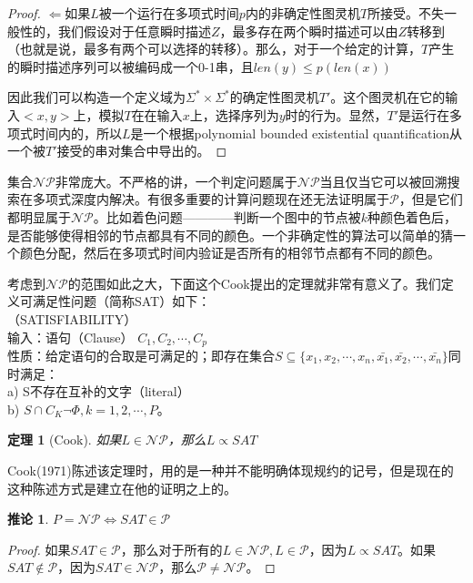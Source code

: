 \documentclass[twocolumn]{article}
\newtheorem{theorem}{\hspace{2em}定理}
\newtheorem{corollary}{\hspace{2em}推论}
\theoremstyle{nonumberplain}%
\newtheorem{proof}{\hspace{2em}证明}
\begin{document}
\begin{CJK}{UTF8}{gbsn}
\begin{proof}
        $\Leftarrow$如果$L$被一个运行在多项式时间$p$内的非确定性图灵机$T$所接受。不失一般性的，我们假设对于任意瞬时描述$Z$，最多存在两个瞬时描述可以由$Z$转移到（也就是说，最多有两个可以选择的转移）。那么，对于一个给定的计算，$T$产生的瞬时描述序列可以被编码成一个0-1串，且$len(y)\leq p(len(x))$

        因此我们可以构造一个定义域为$\Sigma^*\times\Sigma^*$的确定性图灵机$T'$。这个图灵机在它的输入$<x,y>$上，模拟$T$在在输入$x$上，选择序列为$y$时的行为。显然，$T'$是运行在多项式时间内的，所以$L$是一个根据polynomial bounded existential quantification从一个被$T'$接受的串对集合中导出的。
    \end{proof}

    集合$\mathcal{NP}$非常庞大。不严格的讲，一个判定问题属于$\mathcal{NP}$当且仅当它可以被回溯搜索在多项式深度内解决。有很多重要的计算问题现在还无法证明属于$\mathcal{P}$，但是它们都明显属于$\mathcal{NP}$。比如着色问题————判断一个图中的节点被$k$种颜色着色后，是否能够使得相邻的节点都具有不同的颜色。一个非确定性的算法可以简单的猜一个颜色分配，然后在多项式时间内验证是否所有的相邻节点都有不同的颜色。

    考虑到$\mathcal{NP}$的范围如此之大，下面这个Cook提出的定理就非常有意义了。我们定义可满足性问题（简称SAT）如下：\\
    {（SATISFIABILITY）}\\
    输入：语句（Clause） $C_1,C_2,\cdots,C_p$\\
    性质：给定语句的合取是可满足的；即存在集合$S\subseteq\{x_1,x_2,\cdots,x_n,\bar{x_1},\bar{x_2},\cdots,\bar{x_n}\}$同时满足：\\
    \indent a) S不存在互补的文字（literal）\\
    \indent b) $S\cap C_K\neg\Phi,k=1,2,\cdots,P$。

    \begin{theorem}[Cook]
        如果$L\in\mathcal{NP}$，那么$L\propto SAT$
    \end{theorem}

    Cook(1971)陈述该定理时，用的是一种并不能明确体现规约的记号，但是现在的这种陈述方式是建立在他的证明之上的。

    \begin{corollary}
        $P=\mathcal{NP} \Leftrightarrow SAT \in \mathcal{P}$
    \end{corollary}

    \begin{proof}
      如果$SAT\in\mathcal{P}$，那么对于所有的$L\in\mathcal{NP},L\in\mathcal{P}$，因为$L \propto SAT$。如果$SAT\not\in\mathcal{P}$，因为$SAT\in\mathcal{NP}$，那么$\mathcal{P}\neq\mathcal{NP}$。
    \end{proof}


\end{CJK}
\end{document}
